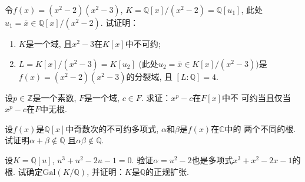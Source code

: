 \begin{solution}
    
\end{solution}

\begin{problem}
    令$f(x) = (x^2 - 2)(x^2 - 3)$,
$K = \mathbb{Q}[x]/(x^2 - 2) = \mathbb{Q}[u_1]$,
此处$u_1 = \bar{x} \in \mathbb{Q}[x]/(x^2 - 2)$.
试证明：
\begin{enumerate}[(1)]
    \item $K$是一个域, 且$x^2 - 3$在$K[x]$中不可约;
    \item $L = K[x]/(x^2 - 3) = K[u_2]$
(此处$u_2 = \bar{x} \in K[x]/(x^2 - 3))$是
$f(x) = (x^2 - 2)(x^2 - 3)$的分裂域, 且
$[L:\mathbb{Q}] = 4$.
\end{enumerate}
\end{problem}

\begin{solution}
    
\end{solution}

\begin{problem}
    设$p \in \mathbb{Z}$是一个素数, $F$是一个域,
$c\in F$. 求证：$x^p - c$在$F[x]$中不
可约当且仅当$x^p - c$在$F$中无根.
\end{problem}

\begin{solution}
    
\end{solution}

\begin{problem}
    设$f(x)$是$\mathbb{Q}[x]$中奇数次的不可约多项式,
$\alpha$和$\beta$是$f(x)$在$\mathbb{C}$中的
两个不同的根. 试证明$\alpha + \beta \notin \mathbb{Q}$
且$\alpha\beta \notin \mathbb{Q}$.
\end{problem}

\begin{solution}
    
\end{solution}

\begin{problem}
    设$K = \mathbb{Q}[u]$, $u^3 + u^2 - 2u - 1 = 0$.
验证$\alpha = u^2 - 2$也是多项式$x^3 + x^2 - 2x - 1$的根.
试确定$\mathrm{Gal}(K/\mathbb{Q})$,
并证明：$K$是$\mathbb{Q}$的正规扩张.
\end{problem}

\begin{solution}
    
\end{solution}

